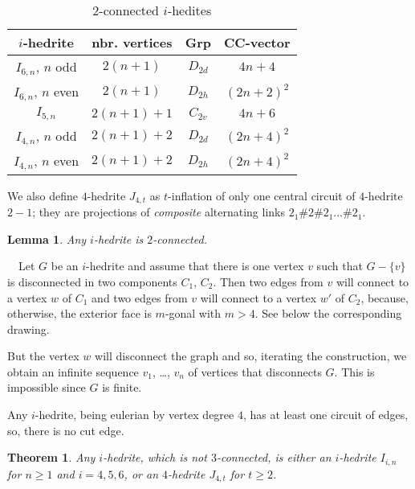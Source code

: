 \documentclass[12pt]{article}
\newtheorem{theor}{Theorem}
\newtheorem{lemma}{Lemma}
\newcommand{\proof}{\noindent{\bf Proof.}\ \ }
\begin{document}
\begin{table}
\begin{center}
\begin{tabular}{||c|c|c|c||}
\hline
$i$-hedrite         &nbr. vertices    &Grp        &CC-vector\\\hline
$I_{6,n}$, $n$ odd  &$2(n+1)$         &$D_{2d}$   &$4n+4$\\
$I_{6,n}$, $n$ even &$2(n+1)$         &$D_{2h}$   &$(2n+2)^2$\\
$I_{5,n}$           &$2(n+1)+1$       &$C_{2v}$   &$4n+6$\\
$I_{4,n}$, $n$ odd  &$2(n+1)+2$       &$D_{2d}$   &$(2n+4)^2$\\
$I_{4,n}$, $n$ even &$2(n+1)+2$       &$D_{2h}$   &$(2n+4)^2$\\\hline
\end{tabular}
\end{center}
\caption{$2$-connected $i$-hedites}
\label{FundamentalInfo}
\end{table}

We also define $4$-hedrite $J_{4,t}$ as $t$-inflation of only one central circuit of $4$-hedrite $2-1$; they are projections of {\em composite} alternating links $2_1\#2\#2_1\dots\#2_1$.



\begin{lemma}
Any $i$-hedrite is $2$-connected.
\end{lemma}
\proof Let $G$ be an $i$-hedrite and assume that there is one vertex $v$ such that $G-\{v\}$ is disconnected in two components $C_1$, $C_2$. Then two edges from $v$ will connect to a vertex $w$ of $C_1$ and two edges from $v$ will connect to a vertex $w'$ of $C_2$, because, otherwise, the exterior face is $m$-gonal with $m>4$. See below the corresponding drawing.

\begin{center}
\epsfxsize=60mm
\end{center}

But the vertex $w$ will disconnect the graph and so, iterating the construction, we obtain an infinite sequence $v_1$, \dots, $v_n$ of vertices that disconnects $G$. 
This is impossible since $G$ is finite.


Any $i$-hedrite, being eulerian by vertex degree $4$, has at least one circuit of edges, so, there is no cut edge.


\begin{theor}\label{3-connectedness}
Any $i$-hedrite, which is not $3$-connected, is either an $i$-hedrite $I_{i,n}$ for $n\geq 1$ and $i=4,5,6$, or an $4$-hedrite $J_{4,t}$ for $t\geq 2$.

\end{theor}
\end{document}

